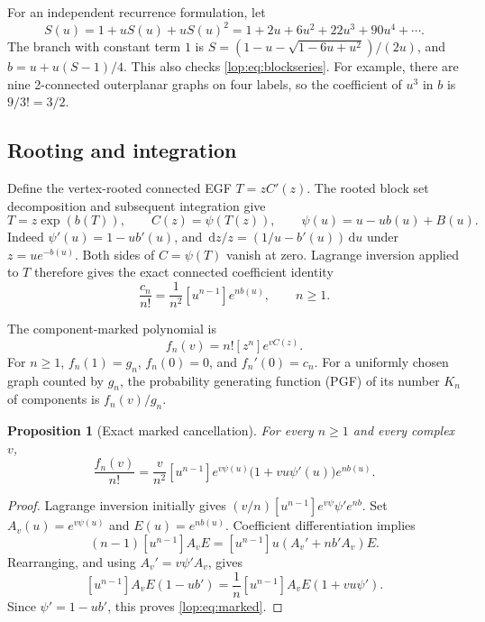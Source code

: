 \documentclass[11pt,letterpaper]{article}
\numberwithin{equation}{section}
\newtheorem{proposition}[theorem]{Proposition}
\theoremstyle{remark}\newtheorem{remark}[theorem]{Remark}
\newcommand{\dd}{\,\mathrm d}
\begin{document}
For an independent recurrence formulation, let
\[
 S(u)=1+uS(u)+uS(u)^2=1+2u+6u^2+22u^3+90u^4+\cdots.
\]
The branch with constant term $1$ is
$S=(1-u-\sqrt{1-6u+u^2})/(2u)$, and
$b=u+u(S-1)/4$. This also checks \eqref{lop:eq:blockseries}. For example,
there are nine 2-connected outerplanar graphs on four labels, so the
coefficient of $u^3$ in $b$ is $9/3!=3/2$.

\subsection{Rooting and integration}
Define the vertex-rooted connected EGF $T=zC'(z)$. The rooted block
set decomposition and subsequent integration give
\begin{equation}\label{lop:eq:rooted}
 T=z\exp(b(T)),\qquad C(z)=\psi(T(z)),\qquad
 \psi(u)=u-ub(u)+B(u).
\end{equation}
Indeed $\psi'(u)=1-ub'(u)$, and
$\dd z/z=(1/u-b'(u))\dd u$ under $z=u e^{-b(u)}$.
Both sides of $C=\psi(T)$ vanish at zero. Lagrange inversion applied
to $T$ therefore gives the exact connected coefficient identity
\begin{equation}\label{lop:eq:connexact}
 \frac{c_n}{n!}=\frac1{n^2}[u^{n-1}]e^{nb(u)},\qquad n\geq1.
\end{equation}

The component-marked polynomial is
\begin{equation}\label{lop:eq:fn}
 f_n(v)=n![z^n]e^{vC(z)}.
\end{equation}
For $n\geq1$, $f_n(1)=g_n$, $f_n(0)=0$, and $f_n'(0)=c_n$.
For a uniformly chosen graph counted by $g_n$, the probability generating
function (PGF) of its number $K_n$ of components is $f_n(v)/g_n$.

\begin{proposition}[Exact marked cancellation]\label{lop:prop:marked}
For every $n\geq1$ and every complex $v$,
\begin{equation}\label{lop:eq:marked}
 \frac{f_n(v)}{n!}=\frac{v}{n^2}[u^{n-1}]
 e^{v\psi(u)}\bigl(1+vu\psi'(u)\bigr)e^{nb(u)}.
\end{equation}
\end{proposition}
\begin{proof}
Lagrange inversion initially gives
$(v/n)[u^{n-1}]e^{v\psi}\psi'e^{nb}$. Set
$A_v(u)=e^{v\psi(u)}$ and $E(u)=e^{nb(u)}$. Coefficient differentiation
implies
\[
 (n-1)[u^{n-1}]A_vE
  =[u^{n-1}]u(A_v'+nb'A_v)E.
\]
Rearranging, and using $A_v'=v\psi'A_v$, gives
\[
 [u^{n-1}]A_vE(1-ub')
   =\frac1n[u^{n-1}]A_vE(1+vu\psi').
\]
Since $\psi'=1-ub'$, this proves \eqref{lop:eq:marked}.
\end{proof}
\end{document}
